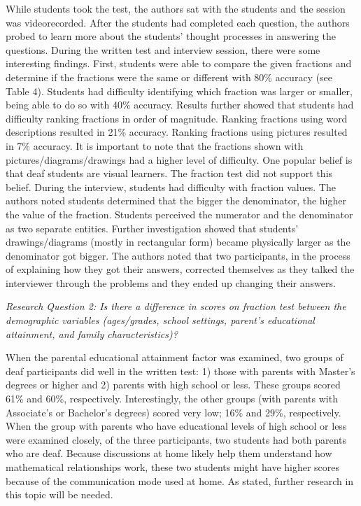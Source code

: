 \documentclass[11.5pt]{sig-alternate} %
\begin{document}
\begin{large}
While students took the test, the authors sat with the students and the session was videorecorded. After the students had completed each question, the authors probed to learn more about the students’ thought processes in answering the questions. During the written test and interview session, there were some interesting findings. First, students were able to compare the given fractions and determine if the fractions were the same or different with 80\% accuracy (see Table 4).  Students had difficulty identifying which fraction was larger or smaller, being able to do so with 40\% accuracy. Results further showed that students had difficulty ranking fractions in order of magnitude. Ranking fractions using word descriptions resulted in 21\% accuracy. Ranking fractions using pictures resulted in 7\% accuracy.  It is important to note that the fractions shown with pictures/diagrams/drawings had a higher level of difficulty. One popular belief is that deaf students are visual learners. The fraction test did not support this belief. During the interview, students had difficulty with fraction values. The authors noted students determined that the bigger the denominator, the higher the value of the fraction. Students perceived the numerator and the denominator as two separate entities. Further investigation showed that students' drawings/diagrams (mostly in rectangular form) became physically larger as the denominator got bigger. The authors noted that two participants, in the process of explaining how they got their answers, corrected themselves as they talked the interviewer through the problems and they ended up changing their answers.

\textit{Research Question 2: Is there a difference in scores on fraction test between the demographic variables (ages/grades, school settings, parent’s educational attainment, and family characteristics)?}

When the parental educational attainment factor was examined, two groups of deaf participants did well in the written test: 1) those with parents with Master’s degrees or higher and 2) parents with high school or less. These groups scored 61\% and 60\%, respectively. Interestingly, the other groups (with parents with Associate’s or Bachelor’s degrees) scored very low; 16\% and 29\%, respectively. When the group with parents who have educational levels of high school or less were examined closely, of the three participants, two students had both parents who are deaf. Because discussions at home likely help them understand how mathematical relationships work, these two students might have higher scores because of the communication mode used at home. As stated, further research in this topic will be needed.


\end{large}
\end{document}
